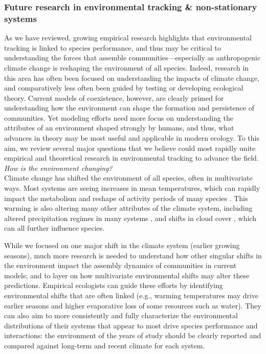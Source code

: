 \documentclass[11pt,letterpaper]{article}
\begin{document}
\subsubsection{Future research in environmental tracking \& non-stationary systems}
As we have reviewed, growing empirical research highlights that environmental tracking is linked to species performance, and thus may be critical to understanding the forces that assemble communities---especially as anthropogenic climate change is reshaping the environment of all species. Indeed, research in this area has often been focused on understanding the impacts of climate change, and comparatively less often been guided by testing or developing ecological theory. Current models of coexistence, however, are clearly primed for understanding how the environment can shape the formation and persistence of communities. Yet modeling efforts need more focus on understanding the attributes of an environment shaped strongly by humans, and thus, what advances in theory may be most useful and applicable in modern ecology. To this aim, we review several major questions that we believe could most rapidly unite empirical and theoretical research in environmental tracking to advance the field.\\

\emph{How is the environment changing?} \\ %

Climate change has shifted the environment of all species, often in multivariate ways. Most systems are seeing increases in mean temperatures, which can rapidly impact the metabolism and reshape of activity periods of many species \citep{Monson:2006vt,IPCC:2014sm}. This warming is also altering many other attributes of the climate system, including altered precipitation regimes in many systems \citep{Diffenbaugh2015}, and shifts in cloud cover \citep{hofer2017}, which can all further influence species. 

While we focused on one major shift in the climate system (earlier growing seasons), much more research is needed to understand how other singular shifts in the environment impact the assembly dynamics of communities in current models; and to layer on how multivariate environmental shifts may alter these predictions. Empirical ecologists can guide these efforts by identifying environmental shifts that are often linked (e.g., warming temperatures may drive earlier seasons and higher evaporative loss of some resources such as water). They can also aim to more consistently and fully characterize the environmental distributions of their systems that appear to most drive species performance and interactions: the environment of the years of study should be clearly reported and compared against long-term and recent climate for each system.\\
\end{document}
